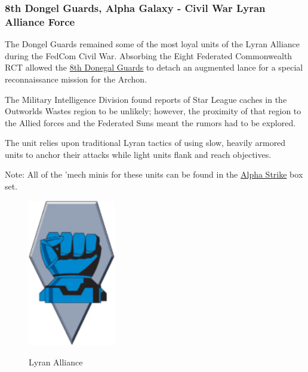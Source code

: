 \subsubsection{8th Dongel Guards, Alpha Galaxy - Civil War Lyran Alliance Force}

The Dongel Guards remained some of the most loyal units of the Lyran Alliance during the FedCom Civil War.
Absorbing the Eight Federated Commonwealth RCT allowed the \href{https://www.sarna.net/wiki/8th_Donegal_Guards}{8th Donegal Guards} to detach an augmented lance for a special reconnaissance mission for the Archon.

The Military Intelligence Division found reports of Star League caches in the Outworlds Wastes region to be unlikely; however, the proximity of that region to the Allied forces and the Federated Suns meant the rumors had to be explored.

The unit relies upon traditional Lyran tactics of using slow, heavily armored units to anchor their attacks while light units flank and reach objectives.
          	
Note: All of the 'mech minis for these units can be found in the \href{https://www.sarna.net/wiki/Alpha_Strike_Boxed_Set}{Alpha Strike} box set.

\begin{figure}[!h]
  \centering
  \includegraphics[alt='Lyran Alliance Logo', width=1.5in, height=2.514in]{img/Lyran-Alliance.png}
  \caption*{Lyran Alliance}
\end{figure}

